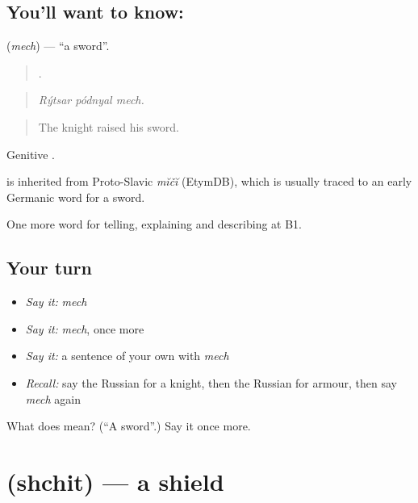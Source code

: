 \subsection*{You'll want to know: }
\textbf{} (\emph{mech}) — \textquotedblleft{}a sword\textquotedblright{}.

\begin{quote}
  .
\end{quote}

\begin{quote}
\emph{Rýtsar pódnyal mech.}
\end{quote}

\begin{quote}
The knight raised his sword.
\end{quote}

Genitive \emph{}.

\begin{cousinweb}
\emph{} is inherited from Proto-Slavic \emph{mĭčĭ} (EtymDB), which is usually traced to an early Germanic word for a sword.
\end{cousinweb}

\begin{grammarlens}[title={What you've built}]
One more word for telling, explaining and describing at B1.
\end{grammarlens}

\subsection*{Your turn}
\begin{itemize}
\raggedright
  \item \emph{Say it:} \emph{mech}
  \item \emph{Say it:} \emph{mech}, once more
  \item \emph{Say it:} a sentence of your own with \emph{mech}
  \item \emph{Recall:} say the Russian for a knight, then the Russian for armour, then say \emph{mech} again
\end{itemize}

\begin{tcolorbox}[breakable,colback=teal!4,colframe=teal!35!black,title={Before you move on}]
What does  mean? (\textquotedblleft{}A sword\textquotedblright{}.) Say it once more.
\end{tcolorbox}
\section[\texorpdfstring{\ru{щит} (shchit)}{щит (shchit)}]{ (shchit) — a shield}

